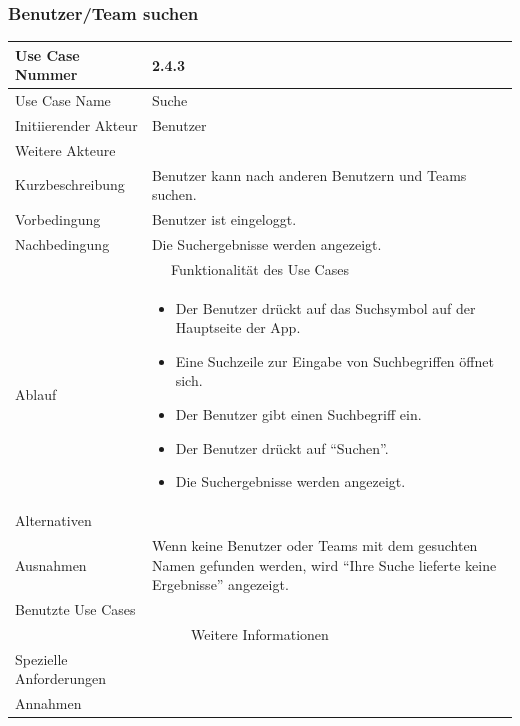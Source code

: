 \documentclass[10pt,a4paper]{article}
\begin{document}
\subsubsection{Benutzer/Team suchen}
	\begin{tabular}{|l|p{.5\linewidth}|}
	\hline Use Case Nummer & 2.4.3 \\ 
	\hline Use Case Name & Suche \\ 
	\hline Initiierender Akteur & Benutzer \\
	\hline Weitere Akteure &  \\
	\hline Kurzbeschreibung & Benutzer kann nach anderen Benutzern und Teams suchen. \\
	\hline Vorbedingung & Benutzer ist eingeloggt. \\
	\hline Nachbedingung & Die Suchergebnisse werden angezeigt. \\
	\hline \multicolumn{2}{|c|}{Funktionalität des Use Cases}\\
	\hline Ablauf & \begin{itemize}
		\item Der Benutzer drückt auf das Suchsymbol auf der Hauptseite der App.
                \item Eine Suchzeile zur Eingabe von Suchbegriffen öffnet sich.
                \item Der Benutzer gibt einen Suchbegriff ein.
		\item Der Benutzer drückt auf ``Suchen''.
		\item Die Suchergebnisse werden angezeigt.
	\end{itemize} \\
	\hline Alternativen & \\
	\hline Ausnahmen & Wenn keine Benutzer oder Teams mit dem gesuchten Namen gefunden werden, wird ``Ihre Suche lieferte keine Ergebnisse'' angezeigt. \\
	\hline Benutzte Use Cases &  \\
	\hline \multicolumn{2}{|c|}{Weitere Informationen} \\
	\hline Spezielle Anforderungen &  \\
	\hline Annahmen &  \\
	\hline
	\end{tabular}
\end{document}
